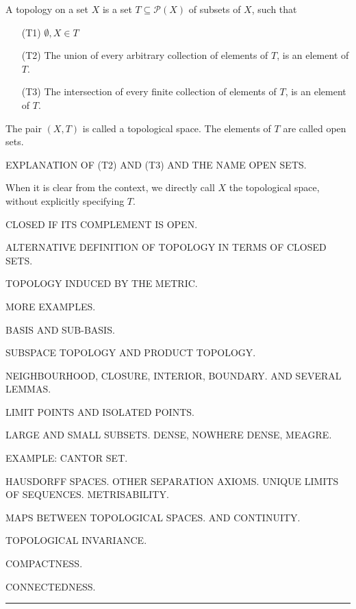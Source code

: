 \documentclass[draft]{penrose}
\begin{document}
\begin{ndfn}
  A topology on a set $X$ is a set $T \subseteq \mathcal{P}(X)$ of subsets of $X$, such that
  \begin{enumerate}
  \item[(T1)] $\emptyset, X \in T$
  \item[(T2)] The union of every arbitrary collection of elements of $T$, is an element of $T$.
  \item[(T3)] The intersection of every finite collection of elements of $T$, is an element of $T$.
  \end{enumerate}
  The pair $(X,T)$ is called a topological space. The elements of $T$ are called open sets.
\end{ndfn}

EXPLANATION OF (T2) AND (T3) AND THE NAME OPEN SETS.

When it is clear from the context, we directly call $X$ the topological space, without explicitly specifying $T$.

CLOSED IF ITS COMPLEMENT IS OPEN.

ALTERNATIVE DEFINITION OF TOPOLOGY IN TERMS OF CLOSED SETS.

TOPOLOGY INDUCED BY THE METRIC.

MORE EXAMPLES.

BASIS AND SUB-BASIS.

SUBSPACE TOPOLOGY AND PRODUCT TOPOLOGY.


NEIGHBOURHOOD, CLOSURE, INTERIOR, BOUNDARY. AND SEVERAL LEMMAS.

LIMIT POINTS AND ISOLATED POINTS.

LARGE AND SMALL SUBSETS. DENSE, NOWHERE DENSE, MEAGRE.

EXAMPLE: CANTOR SET.

HAUSDORFF SPACES. OTHER SEPARATION AXIOMS. UNIQUE LIMITS OF SEQUENCES. METRISABILITY.

MAPS BETWEEN TOPOLOGICAL SPACES. AND CONTINUITY.

TOPOLOGICAL INVARIANCE.

COMPACTNESS.

CONNECTEDNESS.

\begin{center}
  \vspace*{0.5em}
  \rule{0.8\textwidth}{0.8pt}
\end{center}

\nocite{*}
{\small }
\end{document}
